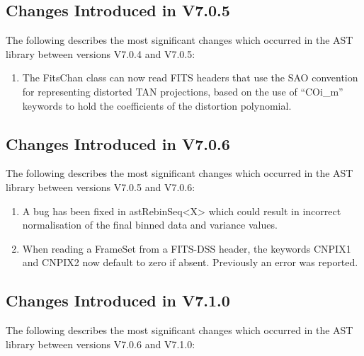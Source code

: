 \documentclass[twoside,11pt]{starlink}
\begin{document}
\subsection{Changes Introduced in V7.0.5}

The following describes the most significant changes which
occurred in the AST library between versions V7.0.4 and V7.0.5:

\begin{enumerate}

\item The FitsChan class can now read FITS headers that use the SAO
convention for representing distorted TAN projections, based on the use
of ``COi\_m'' keywords to hold the coefficients of the distortion polynomial.

\end{enumerate}


\subsection{Changes Introduced in V7.0.6}

The following describes the most significant changes which
occurred in the AST library between versions V7.0.5 and V7.0.6:

\begin{enumerate}

\item A bug has been fixed in astRebinSeq<X> which could result in
incorrect normalisation of the final binned data and variance values.

\item When reading a FrameSet from a FITS-DSS header, the keywords CNPIX1
and CNPIX2 now default to zero if absent. Previously an error was reported.

\end{enumerate}


\subsection{Changes Introduced in V7.1.0}

The following describes the most significant changes which occurred in the
AST library between versions V7.0.6 and V7.1.0:
\end{document}
